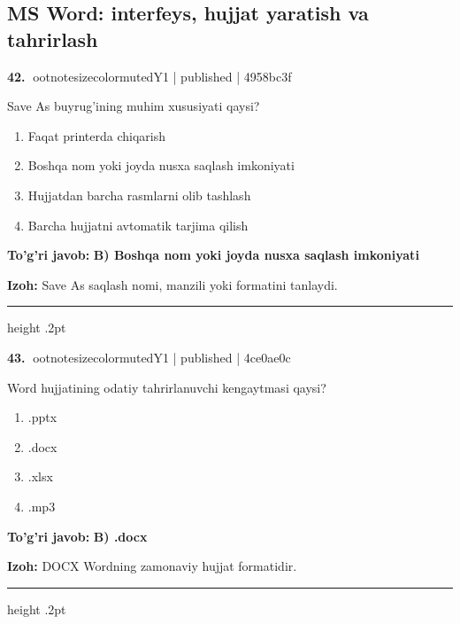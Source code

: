 \documentclass[10pt,a4paper]{article}
\begin{document}
\subsection{MS Word: interfeys, hujjat yaratish va tahrirlash}

\textbf{\color{ink}42.} {ootnotesizecolor{muted}Y1 | published | 4958bc3f}
\par
Save As buyrug'ining muhim xususiyati qaysi?
\begin{enumerate}[label=\Alph*),leftmargin=9mm]
\item Faqat printerda chiqarish
\item Boshqa nom yoki joyda nusxa saqlash imkoniyati
\item Hujjatdan barcha rasmlarni olib tashlash
\item Barcha hujjatni avtomatik tarjima qilish
\end{enumerate}
\begin{tcolorbox}[enhanced,breakable,colback=teal!4,colframe=teal!55!black,boxrule=0.45pt,arc=1.2mm,left=2.8mm,right=2.8mm,top=2mm,bottom=2mm]
\textbf{\color{teal}To'g'ri javob:} \textbf{B) Boshqa nom yoki joyda nusxa saqlash imkoniyati}
\par\smallskip
\textbf{Izoh:} Save As saqlash nomi, manzili yoki formatini tanlaydi.
\end{tcolorbox}
\vspace{2mm}\hrule height .2pt\vspace{2mm}

\textbf{\color{ink}43.} {ootnotesizecolor{muted}Y1 | published | 4ce0ae0c}
\par
Word hujjatining odatiy tahrirlanuvchi kengaytmasi qaysi?
\begin{enumerate}[label=\Alph*),leftmargin=9mm]
\item .pptx
\item .docx
\item .xlsx
\item .mp3
\end{enumerate}
\begin{tcolorbox}[enhanced,breakable,colback=teal!4,colframe=teal!55!black,boxrule=0.45pt,arc=1.2mm,left=2.8mm,right=2.8mm,top=2mm,bottom=2mm]
\textbf{\color{teal}To'g'ri javob:} \textbf{B) .docx}
\par\smallskip
\textbf{Izoh:} DOCX Wordning zamonaviy hujjat formatidir.
\end{tcolorbox}
\vspace{2mm}\hrule height .2pt\vspace{2mm}
\end{document}
